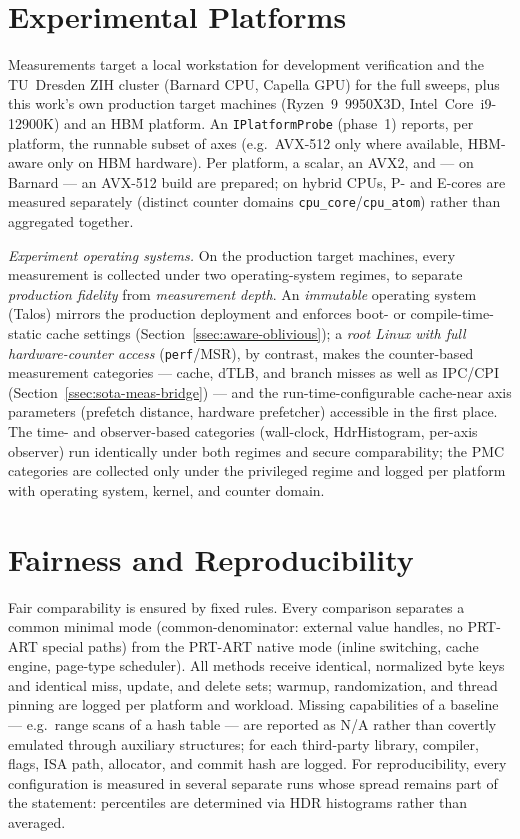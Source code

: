 \section{Experimental Platforms}\label{sec:platforms}

Measurements target a local workstation for development verification and the TU~Dresden ZIH cluster
(Barnard CPU, Capella GPU) for the full sweeps, plus this work's own production target machines (Ryzen~9~9950X3D, %
Intel~Core~i9-12900K) and an HBM platform. An \texttt{IPlatformProbe} (phase~1) reports, per platform,
the runnable subset of axes (e.g.\ AVX-512 only where available, HBM-aware only on HBM hardware).
Per platform, a scalar, an AVX2, and --- on Barnard --- an AVX-512 build are prepared; on hybrid
CPUs, P- and E-cores are measured separately (distinct counter domains
\texttt{cpu\_core}/\texttt{cpu\_atom}) rather than aggregated together.

\smallskip\noindent\emph{Experiment operating systems.} On the production target machines, every measurement
is collected under two operating-system regimes, to separate \emph{production fidelity} from
\emph{measurement depth}. An \emph{immutable} operating system (Talos) mirrors the production
deployment and enforces boot- or compile-time-static cache settings
(Section~\ref{ssec:aware-oblivious}); a \emph{root Linux with full hardware-counter access}
(\texttt{perf}/MSR), by contrast, makes the counter-based measurement categories --- cache, dTLB,
and branch misses as well as IPC/CPI (Section~\ref{ssec:sota-meas-bridge}) --- and the
run-time-configurable cache-near axis parameters (prefetch distance, hardware prefetcher) accessible
in the first place. The time- and observer-based categories (wall-clock, HdrHistogram, per-axis
observer) run identically under both regimes and secure comparability; the PMC categories are
collected only under the privileged regime and logged per platform with operating system, kernel,
and counter domain.

\section{Fairness and Reproducibility}\label{sec:fairness}

Fair comparability is ensured by fixed rules. Every comparison separates a common minimal mode
(common-denominator: external value handles, no PRT-ART special paths) from the PRT-ART native mode
(inline switching, cache engine, page-type scheduler). All methods receive identical, normalized
byte keys and identical miss, update, and delete sets; warmup, randomization, and thread pinning are
logged per platform and workload. Missing capabilities of a baseline --- e.g.\ range scans of a hash
table --- are reported as N/A rather than covertly emulated through auxiliary structures; for each
third-party library, compiler, flags, ISA path, allocator, and commit hash are logged. For
reproducibility, every configuration is measured in several separate runs whose spread remains part
of the statement: percentiles are determined via HDR histograms rather than averaged.

